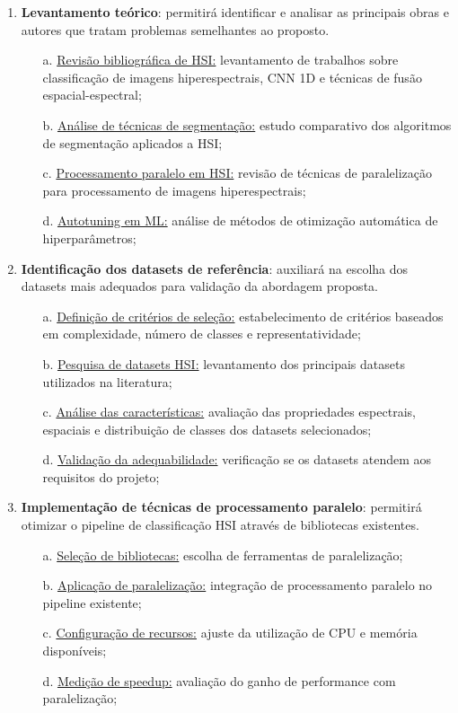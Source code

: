 \documentclass[a4paper,12pt,brazil]{article} %
\begin{document}
\begin{enumerate}
    \item \textbf{Levantamento teórico}: permitirá identificar e analisar as principais obras e autores que tratam problemas semelhantes ao proposto.
    \begin{enumerate}
        \item[a.] \underline{Revisão bibliográfica de HSI:} levantamento de trabalhos sobre classificação de imagens hiperespectrais, CNN 1D e técnicas de fusão espacial-espectral;
        \item[b.] \underline{Análise de técnicas de segmentação:} estudo comparativo dos algoritmos de segmentação aplicados a HSI;
        \item[c.] \underline{Processamento paralelo em HSI:} revisão de técnicas de paralelização para processamento de imagens hiperespectrais;
        \item[d.] \underline{Autotuning em ML:} análise de métodos de otimização automática de hiperparâmetros;
    \end{enumerate}
    
    \item \textbf{Identificação dos datasets de referência}: auxiliará na escolha dos datasets mais adequados para validação da abordagem proposta.
    \begin{enumerate}
        \item[a.] \underline{Definição de critérios de seleção:} estabelecimento de critérios baseados em complexidade, número de classes e representatividade;
        \item[b.] \underline{Pesquisa de datasets HSI:} levantamento dos principais datasets utilizados na literatura;
        \item[c.] \underline{Análise das características:} avaliação das propriedades espectrais, espaciais e distribuição de classes dos datasets selecionados;
        \item[d.] \underline{Validação da adequabilidade:} verificação se os datasets atendem aos requisitos do projeto;
    \end{enumerate}
    
    \item \textbf{Implementação de técnicas de processamento paralelo}: permitirá otimizar o pipeline de classificação HSI através de bibliotecas existentes.
    \begin{enumerate}
        \item[a.] \underline{Seleção de bibliotecas:} escolha de ferramentas de paralelização;
        \item[b.] \underline{Aplicação de paralelização:} integração de processamento paralelo no pipeline existente;
        \item[c.] \underline{Configuração de recursos:} ajuste da utilização de CPU e memória disponíveis;
        \item[d.] \underline{Medição de speedup:} avaliação do ganho de performance com paralelização;
    \end{enumerate}
    

\end{enumerate}
\end{document}
